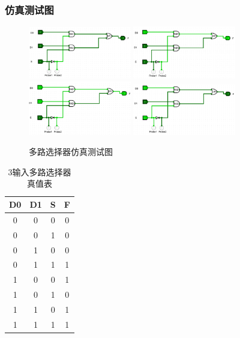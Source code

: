 \documentclass{article}
\begin{document}
    \subsubsection{仿真测试图}
    \begin{figure}[H]
    \centering
    \includegraphics[width=0.4\textwidth]{3.5.1.png}
    \includegraphics[width=0.4\textwidth]{3.5.2.png}
    \includegraphics[width=0.4\textwidth]{3.5.3.png}
    \includegraphics[width=0.4\textwidth]{3.5.4.png}
    \caption{多路选择器仿真测试图}
    \end{figure}

    \begin{table}[H]
    \centering
    \begin{tabular}{|c c c|c|}
        \hline
        D0 & D1 & S & F \\ \hline
        0 & 0 & 0 & 0 \\ \hline
        0 & 0 & 1 & 0 \\ \hline
        0 & 1 & 0 & 0 \\ \hline
        0 & 1 & 1 & 1 \\ \hline
        1 & 0 & 0 & 1 \\ \hline
        1 & 0 & 1 & 0 \\ \hline
        1 & 1 & 0 & 1 \\ \hline
        1 & 1 & 1 & 1 \\ \hline
    \end{tabular}
    \caption{3输入多路选择器真值表}
    \end{table}
\end{document}
